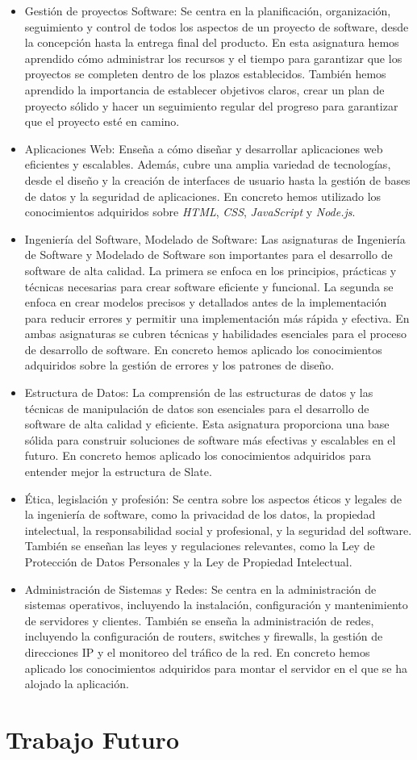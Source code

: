 \begin{itemize}
    \item Gestión de proyectos Software: Se centra en la planificación, organización, seguimiento y control de todos los aspectos de un proyecto de software, desde la concepción hasta la entrega final del producto. En esta asignatura hemos aprendido cómo administrar los recursos y el tiempo para garantizar que los proyectos se completen dentro de los plazos establecidos. También hemos aprendido la importancia de establecer objetivos claros, crear un plan de proyecto sólido y hacer un seguimiento regular del progreso para garantizar que el proyecto esté en camino.
    \item Aplicaciones Web: Enseña a cómo diseñar y desarrollar aplicaciones web eficientes y escalables. Además, cubre una amplia variedad de tecnologías, desde el diseño y la creación de interfaces de usuario hasta la gestión de bases de datos y la seguridad de aplicaciones. En concreto hemos utilizado los conocimientos adquiridos sobre \textit{HTML}, \textit{CSS}, \textit{JavaScript} y \textit{Node.js}.
    \item Ingeniería del Software, Modelado de Software: Las asignaturas de Ingeniería de Software y Modelado de Software son importantes para el desarrollo de software de alta calidad. La primera se enfoca en los principios, prácticas y técnicas necesarias para crear software eficiente y funcional. La segunda se enfoca en crear modelos precisos y detallados antes de la implementación para reducir errores y permitir una implementación más rápida y efectiva. En ambas asignaturas se cubren técnicas y habilidades esenciales para el proceso de desarrollo de software. En concreto hemos aplicado los conocimientos adquiridos sobre la gestión de errores y los patrones de diseño.
    \item Estructura de Datos: La comprensión de las estructuras de datos y las técnicas de manipulación de datos son esenciales para el desarrollo de software de alta calidad y eficiente. Esta asignatura proporciona una base sólida para construir soluciones de software más efectivas y escalables en el futuro. En concreto hemos aplicado los conocimientos adquiridos para entender mejor la estructura de Slate.
    \item Ética, legislación y profesión: Se centra sobre los aspectos éticos y legales de la ingeniería de software, como la privacidad de los datos, la propiedad intelectual, la responsabilidad social y profesional, y la seguridad del software. También se enseñan las leyes y regulaciones relevantes, como la Ley de Protección de Datos Personales y la Ley de Propiedad Intelectual.
    \item Administración de Sistemas y Redes: Se centra en la administración de sistemas operativos, incluyendo la instalación, configuración y mantenimiento de servidores y clientes. También se enseña la administración de redes, incluyendo la configuración de routers, switches y firewalls, la gestión de direcciones IP y el monitoreo del tráfico de la red. En concreto hemos aplicado los conocimientos adquiridos para montar el servidor en el que se ha alojado la aplicación.
\end{itemize}

\section{Trabajo Futuro}
\label{sec:TrabajoFuturo}